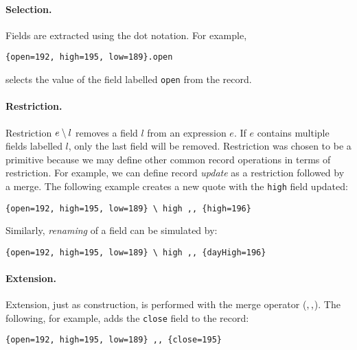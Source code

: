 \paragraph{Selection.}
Fields are extracted using the dot notation. For example,
\begin{lstlisting}
{open=192, high=195, low=189}.open
\end{lstlisting}
selects the value of the field labelled \lstinline{open} from the record.

\paragraph{Restriction.}
Restriction $e \setminus l$ removes a field $l$ from an expression $e$. If $e$
contains multiple fields labelled $l$, only the last field will be removed.
Restriction was chosen to be a primitive because we may define other common
record operations in terms of restriction. For example, we can define record
\emph{update} as a restriction followed by a merge. The following example
creates a new quote with the \lstinline{high} field updated:
\begin{lstlisting}
{open=192, high=195, low=189} \ high ,, {high=196} 
\end{lstlisting}
Similarly, \emph{renaming} of a field can be simulated by:
\begin{lstlisting}
{open=192, high=195, low=189} \ high ,, {dayHigh=196} 
\end{lstlisting}

\begin{comment}
Refinement of fields is also possible, in the sense
that the type of a new value can be a subtype of that of the old
one.~\footnote{The subtyping restriction is not required for the \name to be
  coherent and it leaves option open for language designers.}
\bruno{Are we going to show an example of this?}
\end{comment}

\paragraph{Extension.}
Extension, just as construction, is performed with the merge operator
($ ,, $). The following, for example, adds the \lstinline{close}
field to the record:
\begin{lstlisting}
{open=192, high=195, low=189} ,, {close=195}
\end{lstlisting}

